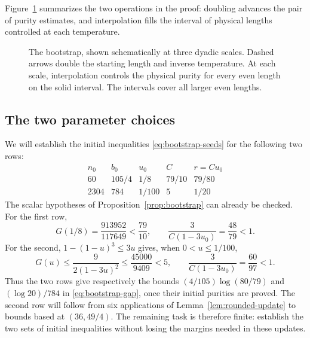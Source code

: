 Figure~\ref{fig:bootstrap} summarizes the two operations in the proof:
doubling advances the pair of purity estimates, and interpolation fills
the interval of physical lengths controlled at each temperature.

\begin{figure}[tb]
\centering
{}
\caption{The bootstrap, shown schematically at three dyadic scales.
Dashed arrows double the starting length and inverse temperature.
At each scale, interpolation controls the physical purity for every
even length on the solid interval.  The intervals cover all larger
even lengths.}
\label{fig:bootstrap}
\end{figure}

\subsection{The two parameter choices}

We will establish the initial inequalities
\eqref{eq:bootstrap-seeds} for the following two rows:
\begin{equation}\label{eq:bootstrap-parameters}
\begin{array}{c|c|c|c|c}
 n_0&b_0&u_0&C&r=Cu_0\\ \hline
 60&105/4&1/8&79/10&79/80\\
 2304&784&1/100&5&1/20
\end{array}
\end{equation}
The scalar hypotheses of Proposition~\ref{prop:bootstrap} can already
be checked. For the first row,
\[
 G(1/8)=\frac{913952}{117649}<\frac{79}{10},\qquad
 \frac{3}{C(1-3u_0)}=\frac{48}{79}<1.
\]
For the second, $1-(1-u)^3\le3u$ gives, when $0<u\le1/100$,
\[
 G(u)\le\frac{9}{2(1-3u)^2}
 \le\frac{45000}{9409}<5,\qquad
 \frac{3}{C(1-3u_0)}=\frac{60}{97}<1.
\]
Thus the two rows give respectively the bounds
$(4/105)\log(80/79)$ and $(\log20)/784$ in
\eqref{eq:bootstrap-gap}, once their initial purities are proved.
The second row will follow from six applications of
Lemma~\ref{lem:rounded-update} to bounds based at $(36,49/4)$.
The remaining task is therefore finite: establish the two sets of
initial inequalities without losing the margins needed in these
updates.
